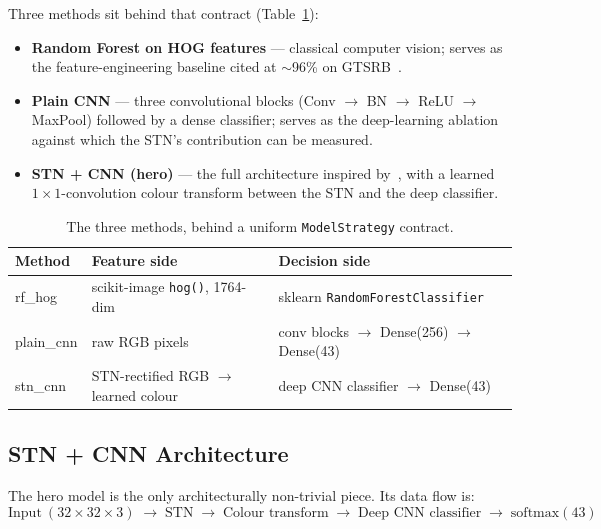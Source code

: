 \documentclass[11pt,a4paper]{article}
\begin{document}
Three methods sit behind that contract (Table~\ref{tab:methods}):
\begin{itemize}
  \item \textbf{Random Forest on HOG features} — classical computer vision; serves as the feature-engineering baseline cited at $\sim$96\% on GTSRB~\cite{zaklouta2011realtime}.
  \item \textbf{Plain CNN} — three convolutional blocks (Conv $\to$ BN $\to$ ReLU $\to$ MaxPool) followed by a dense classifier; serves as the deep-learning ablation against which the STN's contribution can be measured.
  \item \textbf{STN + CNN (hero)} — the full architecture inspired by~\cite{jaderberg2015stn}, with a learned $1\!\times\!1$-convolution colour transform between the STN and the deep classifier.
\end{itemize}

\begin{table}[htbp]
\centering
\caption{The three methods, behind a uniform \texttt{ModelStrategy} contract.}
\label{tab:methods}
\small
\begin{tabular}{@{}>{\raggedright\arraybackslash}p{}>{\raggedright\arraybackslash}p{}>{\raggedright\arraybackslash}p{}@{}}
\toprule
Method      & Feature side                         & Decision side \\
\midrule
rf\_hog     & scikit-image \texttt{hog()}, 1764-dim & sklearn \texttt{RandomForestClassifier} \\
plain\_cnn  & raw RGB pixels                        & 3 conv blocks $\to$ Dense(256) $\to$ Dense(43) \\
stn\_cnn    & STN-rectified RGB $\to$ learned colour  & deep CNN classifier $\to$ Dense(43) \\
\bottomrule
\end{tabular}
\end{table}

\subsection{STN + CNN Architecture}
The hero model is the only architecturally non-trivial piece. Its data flow is:
\[
\text{Input}~(32\!\times\!32\!\times\!3) \;\to\; \text{STN} \;\to\; \text{Colour transform} \;\to\; \text{Deep CNN classifier} \;\to\; \text{softmax}(43)
\]
\end{document}
